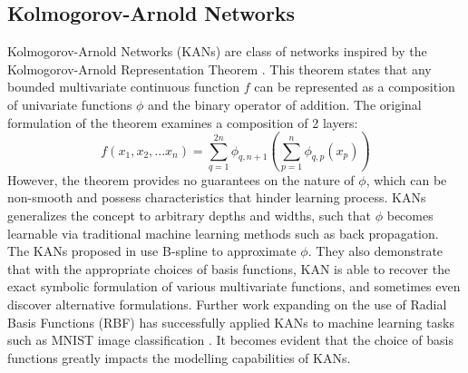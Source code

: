 \documentclass{article}
\begin{document}
\subsection{Kolmogorov-Arnold Networks}
Kolmogorov-Arnold Networks (KANs) \cite{liu2024kan} are class of networks inspired by the Kolmogorov-Arnold Representation Theorem \cite{AndreyKolmogorov,VladimirArnold}. This theorem states that any bounded multivariate continuous function $f$ can be represented as a composition of univariate functions $\phi$ and the binary operator of addition. The original formulation of the theorem examines a composition of 2 layers:
\begin{equation}
    f(x_1, x_2, ... x_n) = \sum_{q=1}^{2n}\phi_{q,n+1}\left(\sum_{p=1}^{n}\phi_{q,p}(x_p)\right)
    \label{eq:Kolmogorov-Arnold-Theorem}
\end{equation}
However, the theorem provides no guarantees on the nature of $\phi$, which can be non-smooth and possess characteristics that hinder learning process. KANs generalizes the concept to arbitrary depths and widths, such that $\phi$ becomes learnable via traditional machine learning methods such as back propagation. The KANs proposed in \cite{liu2024kan} use B-spline to approximate $\phi$. They also demonstrate that with the appropriate choices of basis functions, KAN is able to recover the exact symbolic formulation of various multivariate functions, and sometimes even discover alternative formulations. Further work \cite{li2024kolmogorovarnold} expanding on the use of Radial Basis Functions (RBF) has successfully applied KANs to machine learning tasks such as MNIST image classification \cite{MNIST}. It becomes evident that the choice of basis functions greatly impacts the modelling capabilities of KANs.
\end{document}
